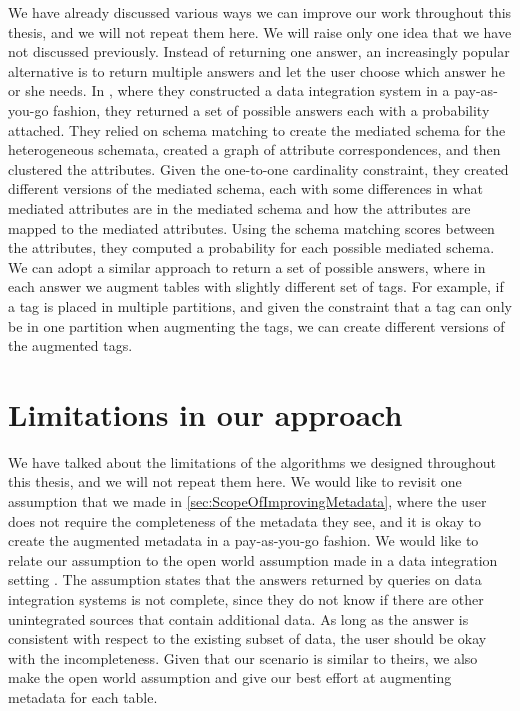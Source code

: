 We have already discussed various ways we can improve our work throughout this thesis, and we will not repeat them here. We will raise only one idea that we have not discussed previously. Instead of returning one answer, an increasingly popular alternative is to return multiple answers and let the user choose which answer he or she needs. In \cite{ilprints851}, where they constructed a data integration system in a pay-as-you-go fashion, they returned a set of possible answers each with a probability attached. They relied on schema matching to create the mediated schema for the heterogeneous schemata, created a graph of attribute correspondences, and then clustered the attributes. Given the one-to-one cardinality constraint, they created different versions of the mediated schema, each with some differences in what mediated attributes are in the mediated schema and how the attributes are mapped to the mediated attributes. Using the schema matching scores between the attributes, they computed a probability for each possible mediated schema. We can adopt a similar approach to return a set of possible answers, where in each answer we augment tables with slightly different set of tags. For example, if a tag is placed in multiple partitions, and given the constraint that a tag can only be in one partition when augmenting the tags, we can create different versions of the augmented tags.

\section{Limitations in our approach}
\label{sec:LimitationsInOurApproach}

We have talked about the limitations of the algorithms we designed throughout this thesis, and we will not repeat them here. We would like to revisit one assumption that we made in \autoref{sec:ScopeOfImprovingMetadata}, where the user does not require the completeness of the metadata they see, and it is okay to create the augmented metadata in a pay-as-you-go fashion. We would like to relate our assumption to the open world assumption made in a data integration setting \cite{Doan2001Reconciling}. The assumption states that the answers returned by queries on data integration systems is not complete, since they do not know if there are other unintegrated sources that contain additional data. As long as the answer is consistent with respect to the existing subset of data, the user should be okay with the incompleteness. Given that our scenario is similar to theirs, we also make the open world assumption and give our best effort at augmenting metadata for each table.


